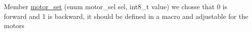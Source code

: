 
\begin{DoxyRefList}
\item[Member \mbox{\hyperlink{motor_8h_a0aa6c302c8189571af7af83c07313a7e}{motor\+\_\+set}} (enum motor\+\_\+sel sel, int8\+\_\+t value)]\label{todo__todo000001}%
%
we chosse that 0 is forward and 1 is backward, it should be defined in a macro and adjustable for the motors 
\end{DoxyRefList}